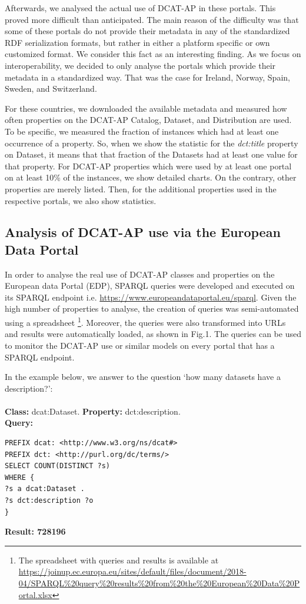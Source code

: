 \documentclass[<options>]{elsarticle}
\begin{document}
Afterwards, we analysed the actual use of DCAT-AP in these portals. This proved more difficult than anticipated. The main reason of the difficulty was that some of these portals do not provide their metadata in any of the standardized RDF serialization formats, but rather in either a platform specific or own customized format. We consider this fact as an interesting finding. As we focus on interoperability, we decided to only analyse the portals which provide their metadata in a standardized way. That was the case for Ireland, Norway, Spain, Sweden, and Switzerland.

For these countries, we downloaded the available metadata and measured how often properties on the DCAT-AP Catalog, Dataset, and Distribution are used. To be specific, we measured the fraction of instances which had at least one occurrence of a property. So, when we show the statistic for the \textit{dct:title} property on Dataset, it means that that fraction of the Datasets had at least one value for that property. For DCAT-AP properties which were used by at least one portal on at least 10\% of the instances, we show detailed charts. On the contrary, other properties are merely listed. Then, for the additional properties used in the respective portals, we also show statistics.

\subsection{Analysis of DCAT-AP use via the European Data Portal}

In order to analyse the real use of DCAT-AP classes and properties on the European data Portal (EDP), SPARQL queries were developed and executed on its SPARQL endpoint i.e. \url{https://www.europeandataportal.eu/sparql}. Given the high number of properties to analyse, the creation of queries was semi-automated using a spreadsheet \footnote{The spreadsheet with queries and results is available at  \url{https://joinup.ec.europa.eu/sites/default/files/document/2018-04/SPARQL\%20query\%20results\%20from\%20the\%20European\%20Data\%20Portal.xlsx}}. Moreover, the queries were also transformed into URLs and results were automatically loaded, as shown in Fig.1. The queries can be used to monitor the DCAT-AP use or similar models on every portal that has a SPARQL endpoint.

In the example below, we answer to the question ‘how many datasets have a description?’:
\\
\\
\textbf{Class:} dcat:Dataset. \textbf{Property:} dct:description. \\
\textbf{Query:}
\begin{lstlisting}
PREFIX dcat: <http://www.w3.org/ns/dcat#>
PREFIX dct: <http://purl.org/dc/terms/>
SELECT COUNT(DISTINCT ?s)
WHERE {
?s a dcat:Dataset .
?s dct:description ?o
}
\end{lstlisting}
\textbf{Result: 728196}
\end{document}
